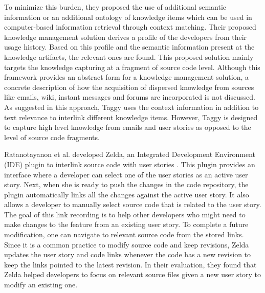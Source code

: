 To minimize this burden, they proposed the use of additional semantic information or an additional ontology of knowledge items which can be used in computer-based information retrieval through context matching. Their proposed knowledge management solution derives a profile of the developers from their usage history. Based on this profile and the semantic information present at the knowledge artifacts, the relevant ones are found. This proposed solution mainly targets the knowledge capturing at a fragment of source code level. Although this framework provides an abstract form for a knowledge management solution, a concrete description of how the acquisition of dispersed knowledge from sources like emails, wiki, instant messages and forums are incorporated is not discussed. As suggested in this approach, Taggy uses the context information in addition to text relevance to interlink different knowledge items. However, Taggy is designed to capture high level knowledge from emails and user stories as opposed to the level of source code fragments.

Ratanotayanon et al. developed Zelda, an Integrated Development Environment (IDE) plugin to interlink source code with user stories \cite{supporting_program}. This plugin provides an interface where a developer can select one of the user stories as an active user story. Next, when she is ready to push the changes in the code repository, the plugin automatically links all the changes against the active user story. It also allows a developer to manually select source code that is related to the user story. The goal of this link recording is to help other developers who might need to make changes to the feature from an existing user story. To complete a future modification, one can navigate to relevant source code from the stored links. Since it is a common practice to modify source code and keep revisions, Zelda updates the user story and code links whenever the code has a new revision to keep the links pointed to the latest revision. In their evaluation, they found that Zelda helped developers to focus on relevant source files given a new user story to modify an existing one.

